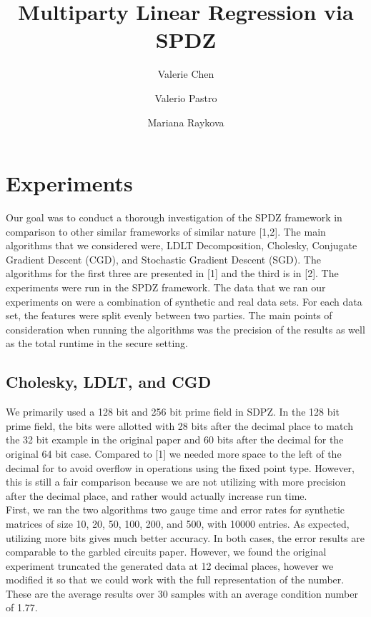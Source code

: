 \documentclass{article}
\title{Multiparty Linear Regression via SPDZ}
\author{Valerie Chen \and Valerio Pastro \and Mariana Raykova}
\date{}
\theoremstyle{plain}
\theoremstyle{definition}
\theoremstyle{remark}
\begin{document}
\maketitle
\section{Experiments} 

Our goal was to conduct a thorough investigation of the SPDZ framework in comparison to other similar frameworks of similar nature [1,2]. The main algorithms that we considered were, LDLT Decomposition, Cholesky, Conjugate Gradient Descent (CGD), and Stochastic Gradient Descent (SGD). The algorithms for the first three are presented in [1] and the third is in [2]. The experiments were run in the SPDZ framework. The data that we ran our experiments on were a combination of synthetic and real data sets. For each data set, the features were split evenly between two parties. The main points of consideration when running the algorithms was the precision of the results as well as the total runtime in the secure setting. 

\subsection{Cholesky, LDLT, and CGD}

We primarily used a 128 bit and 256 bit prime field in SDPZ. In the 128 bit prime field, the bits were allotted with 28 bits after the decimal place to match the 32 bit example in the original paper and 60 bits after the decimal for the original 64 bit case. Compared to [1] we needed more space to the left of the decimal for to avoid overflow in operations using the fixed point type. However, this is still a fair comparison because we are not utilizing with more precision after the decimal place, and rather would actually increase run time.\\

\noindent
First, we ran the two algorithms two gauge time and error rates for synthetic matrices of size 10, 20, 50, 100, 200, and 500, with 10000 entries. As expected, utilizing more bits gives much better accuracy. In both cases, the error results are comparable to the garbled circuits paper. However, we found the original experiment truncated the generated data at 12 decimal places, however we modified it so that we could work with the full representation of the number. These are the average results over 30 samples with an average condition number of 1.77.
\end{document}
